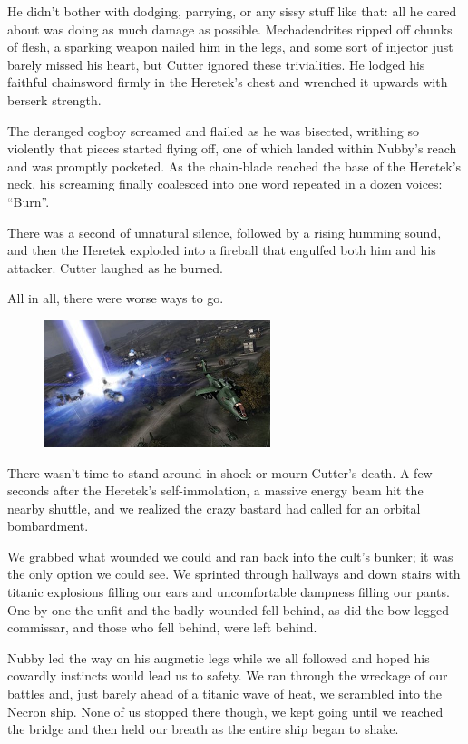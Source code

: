 He didn’t bother with dodging, parrying, or any sissy stuff like that: 
all he cared about was doing as much damage as possible. 
Mechadendrites ripped off chunks of flesh, a sparking weapon nailed him in the legs, and some sort of injector just barely missed his heart, but Cutter ignored these trivialities. 
He lodged his faithful chainsword firmly in the Heretek’s chest and wrenched it upwards with berserk strength.

The deranged cogboy screamed and flailed as he was bisected, writhing so violently that pieces started flying off, one of which landed within Nubby’s reach and was promptly pocketed. 
As the chain-blade reached the base of the Heretek’s neck, his screaming finally coalesced into one word repeated in a dozen voices: 
“Burn”. 


There was a second of unnatural silence, followed by a rising humming sound, and then the Heretek exploded into a fireball that engulfed both him and his attacker. 
Cutter laughed as he burned.

All in all, there were worse ways to go.

\begin{figure}
	\begin{center}
		\includegraphics[width=\figwidth]{pics/8/58.png}
	\end{center}
\end{figure}
There wasn’t time to stand around in shock or mourn Cutter’s death. 
A few seconds after the Heretek’s self-immolation, a massive energy beam hit the nearby shuttle, and we realized the crazy bastard had called for an orbital bombardment.

We grabbed what wounded we could and ran back into the cult’s bunker; 
it was the only option we could see. 
We sprinted through hallways and down stairs with titanic explosions filling our ears and uncomfortable dampness filling our pants. 
One by one the unfit and the badly wounded fell behind, as did the bow-legged commissar, and those who fell behind, were left behind.

Nubby led the way on his augmetic legs while we all followed and hoped his cowardly instincts would lead us to safety. 
We ran through the wreckage of our battles and, just barely ahead of a titanic wave of heat, we scrambled into the Necron ship. 
None of us stopped there though, we kept going until we reached the bridge and then held our breath as the entire ship began to shake.

